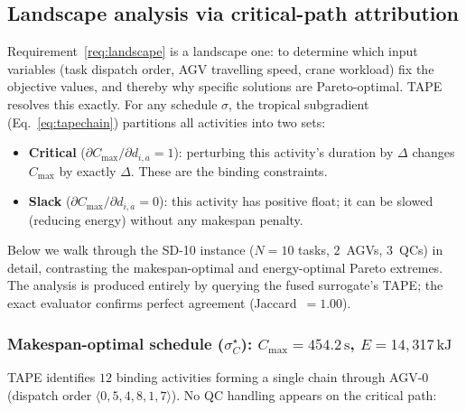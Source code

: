 \documentclass[11pt]{article}
\begin{document}
\subsection{Landscape analysis via critical-path attribution}
\label{sec:r2worked}

Requirement~\ref{req:landscape} is a landscape one: to determine which input variables (task
dispatch order, AGV travelling speed, crane workload) fix the objective values, and thereby
why specific solutions are Pareto-optimal. TAPE resolves this exactly. For any schedule
$\sigma$, the tropical subgradient (Eq.~\ref{eq:tapechain}) partitions all activities into
two sets:
\begin{itemize}[nosep]
  \item \textbf{Critical} ($\partial C_{\max}/\partial d_{i,a} = 1$): perturbing this
    activity's duration by $\Delta$ changes $C_{\max}$ by exactly $\Delta$. These are the
    binding constraints.
  \item \textbf{Slack} ($\partial C_{\max}/\partial d_{i,a} = 0$): this activity has
    positive float; it can be slowed (reducing energy) without any makespan penalty.
\end{itemize}
Below we walk through the SD-10 instance ($N{=}10$ tasks, $2$~AGVs, $3$~QCs) in detail,
contrasting the makespan-optimal and energy-optimal Pareto extremes. The analysis is
produced entirely by querying the fused surrogate's TAPE; the exact evaluator confirms perfect
agreement (Jaccard~$= 1.00$).

\subsubsection{Makespan-optimal schedule ($\sigma^\star_{C}$): $C_{\max}=454.2\,\mathrm{s}$, $E=14{,}317\,\mathrm{kJ}$}

TAPE identifies $12$ binding activities forming a single chain through AGV-0 (dispatch
order $\langle 0, 5, 4, 8, 1, 7\rangle$). No QC handling appears on the critical path:
\end{document}

